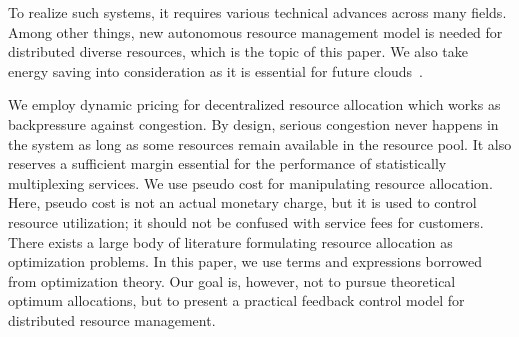 To realize such systems, it requires various technical advances across
many fields.  Among other things, new autonomous resource management
model is needed for distributed diverse resources,
which is the topic of this paper.
We also take energy saving into consideration as it is
essential for future clouds~\cite{Mastelic-2015,masanet2020recalibrating}.


We employ dynamic pricing for decentralized resource
allocation which works as backpressure against congestion.
By design, serious congestion never happens in the system as long as
some resources remain available in the resource pool.
It also reserves a sufficient margin essential for the performance of
statistically multiplexing services.
We use pseudo cost for manipulating resource allocation.
Here, pseudo cost is not an actual monetary charge, but it is used to
control resource utilization; it should not be confused with service
fees for customers.
There exists a large body of literature formulating resource allocation
as optimization problems.
In this paper, we use terms and expressions borrowed from optimization
theory. Our goal is, however, not to pursue theoretical optimum
allocations, but to present a practical feedback control model for
distributed resource management.


